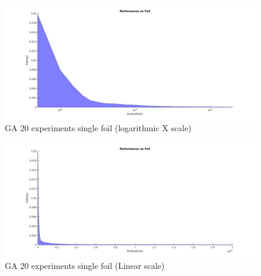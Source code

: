 \documentclass{article}
\begin{document}
\begin{itemize}
\begin{figure}[ht!]
            \centering
            \includegraphics[width=1.0\linewidth]{ga_20exp_1foil.jpg}
            \caption{GA 20 experiments single foil (logarithmic X scale)\label{fig:1}}
        \end{figure}
        \begin{figure}[ht!]
            \centering
            \includegraphics[width=1.0\linewidth]{ga_20exp_1foil_linear.jpg}
            \caption{GA 20 experiments single foil (Linear scale)\label{fig:2}}
        \end{figure}


\end{itemize}
\end{document}
